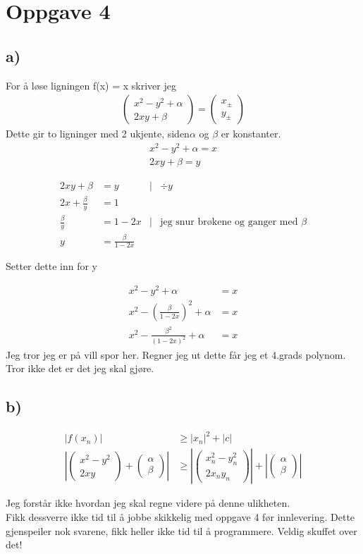 \documentclass[a4paper,12pt,norsk]{article}
\begin{document}
\section{Oppgave 4}
\subsection{a)}
For å løse ligningen f(x) = x skriver jeg
\begin{align*}
\left(\begin{array}{cc} x^2 -y^2+\alpha\\2xy + \beta \end{array}\right) 
= \left(\begin{array}{cc} x_\pm\\y_\pm\end{array}\right)
\end{align*}
Dette gir to ligninger med 2 ukjente, siden$\alpha$ og $\beta$ er konstanter.
\begin{align*}
x^2 -y^2+\alpha = x\\
2xy + \beta = y
\end{align*}

\begin{align*}
2xy + \beta &= y  &|&\div y\\
2x +\frac{\beta}{y} &= 1 \\
\frac{\beta}{y} &= 1 - 2x &|& \text{jeg snur brøkene og ganger med } \beta\\
y &= \frac{\beta}{1-2x}
\end{align*}

Setter dette inn for y

\begin{align*}
x^2 -y^2+\alpha &= x\\
x^2 -\left(\frac{\beta}{1-2x} \right)^2 + \alpha &=x \\
x^2 - \frac{\beta^2}{(1-2x)^2} + \alpha &=x
\end{align*}
Jeg tror jeg er på vill spor her. Regner jeg ut dette får jeg et 4.grads polynom. Tror ikke det er det jeg skal gjøre. 

\subsection{b)}

\begin{align*}
|f(x_n)| &\geq |x_n|^2 + |c| \\
\left|\left(\begin{array}{cc}x^2-y^2\\2xy\end{array}\right) + \left(\begin{array}{cc} \alpha\\ \beta\end{array}\right)\right| &\geq \left| \left(\begin{array}{cc}x_n^2-y_n^2\\2x_ny_n\end{array}\right)\right| +\left| \left(\begin{array}{cc} \alpha\\ \beta\end{array}\right)\right|
\end{align*}

Jeg forstår ikke hvordan jeg skal regne videre på denne ulikheten.\\
Fikk dessverre ikke tid til å jobbe skikkelig med oppgave 4 før innlevering. Dette gjenspeiler nok svarene, fikk heller ikke tid til å programmere. Veldig skuffet over det!
\end{document}
